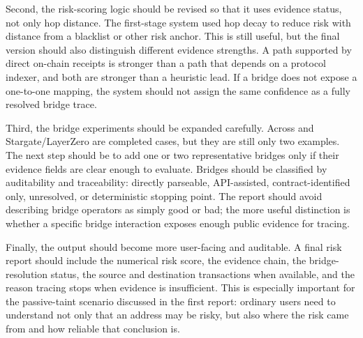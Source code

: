 \documentclass[12pt,a4paper]{article}
\begin{document}
Second, the risk-scoring logic should be revised so that it uses evidence status, not only hop distance. The first-stage system used hop decay to reduce risk with distance from a blacklist or other risk anchor. This is still useful, but the final version should also distinguish different evidence strengths. A path supported by direct on-chain receipts is stronger than a path that depends on a protocol indexer, and both are stronger than a heuristic lead. If a bridge does not expose a one-to-one mapping, the system should not assign the same confidence as a fully resolved bridge trace.

Third, the bridge experiments should be expanded carefully. Across and Stargate/LayerZero are completed cases, but they are still only two examples. The next step should be to add one or two representative bridges only if their evidence fields are clear enough to evaluate. Bridges should be classified by auditability and traceability: directly parseable, API-assisted, contract-identified only, unresolved, or deterministic stopping point. The report should avoid describing bridge operators as simply good or bad; the more useful distinction is whether a specific bridge interaction exposes enough public evidence for tracing.

Finally, the output should become more user-facing and auditable. A final risk report should include the numerical risk score, the evidence chain, the bridge-resolution status, the source and destination transactions when available, and the reason tracing stops when evidence is insufficient. This is especially important for the passive-taint scenario discussed in the first report: ordinary users need to understand not only that an address may be risky, but also where the risk came from and how reliable that conclusion is.



\end{document}
